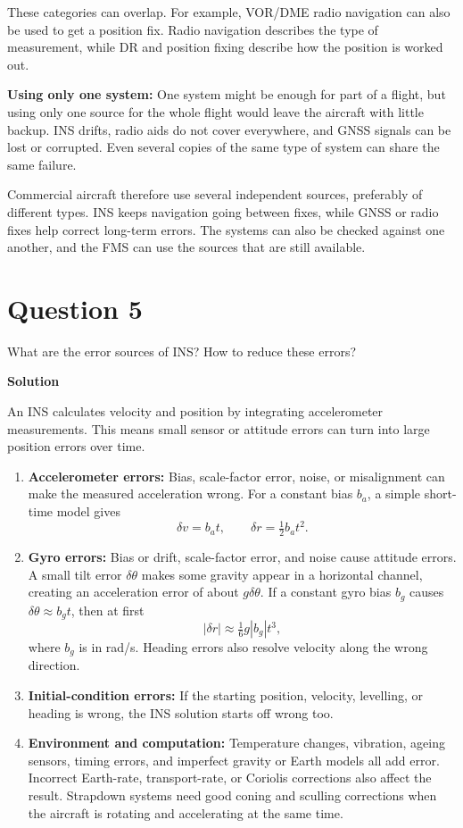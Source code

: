 \documentclass[12pt,a4paper]{article}
\begin{document}
These categories can overlap. For example, VOR/DME radio navigation can also be used to get a position fix. Radio navigation describes the type of measurement, while DR and position fixing describe how the position is worked out.

\textbf{Using only one system:} One system might be enough for part of a flight, but using only one source for the whole flight would leave the aircraft with little backup. INS drifts, radio aids do not cover everywhere, and GNSS signals can be lost or corrupted. Even several copies of the same type of system can share the same failure.

Commercial aircraft therefore use several independent sources, preferably of different types. INS keeps navigation going between fixes, while GNSS or radio fixes help correct long-term errors. The systems can also be checked against one another, and the FMS can use the sources that are still available.

\newpage
\section*{Question 5}
What are the error sources of INS? How to reduce these errors?

\textbf{Solution}

An INS calculates velocity and position by integrating accelerometer measurements. This means small sensor or attitude errors can turn into large position errors over time.

\begin{enumerate}[itemsep=0.15em]
\item \textbf{Accelerometer errors:} Bias, scale-factor error, noise, or misalignment can make the measured acceleration wrong. For a constant bias $b_a$, a simple short-time model gives
\[
\delta v=b_a t,\qquad \delta r=\tfrac12 b_a t^2.
\]
\item \textbf{Gyro errors:} Bias or drift, scale-factor error, and noise cause attitude errors. A small tilt error $\delta\theta$ makes some gravity appear in a horizontal channel, creating an acceleration error of about $g\delta\theta$. If a constant gyro bias $b_g$ causes $\delta\theta\approx b_g t$, then at first
\[
|\delta r|\approx\tfrac16 g|b_g|t^3,
\]
where $b_g$ is in rad/s. Heading errors also resolve velocity along the wrong direction.
\item \textbf{Initial-condition errors:} If the starting position, velocity, levelling, or heading is wrong, the INS solution starts off wrong too.
\item \textbf{Environment and computation:} Temperature changes, vibration, ageing sensors, timing errors, and imperfect gravity or Earth models all add error. Incorrect Earth-rate, transport-rate, or Coriolis corrections also affect the result. Strapdown systems need good coning and sculling corrections when the aircraft is rotating and accelerating at the same time.
\end{enumerate}
\end{document}
